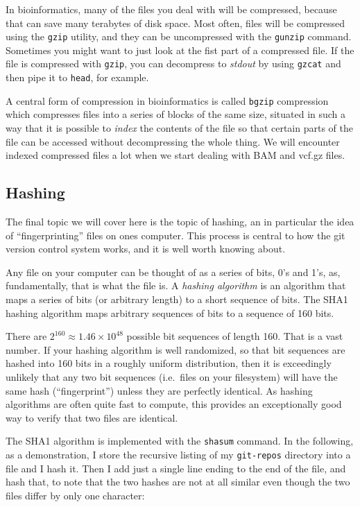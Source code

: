 \documentclass[]{krantz}
\begin{document}
In bioinformatics, many of the files you deal with will be compressed, because that
can save many terabytes of disk space. Most often, files will be compressed using the
\texttt{gzip} utility, and they can be uncompressed with the \texttt{gunzip} command. Sometimes
you might want to just look at the fist part of a compressed file. If the file is compressed
with \texttt{gzip}, you can decompress to \emph{stdout} by using \texttt{gzcat} and then pipe it to \texttt{head}, for example.

A central form of compression in bioinformatics is called \texttt{bgzip} compression
which compresses files into a series of blocks of the same size, situated in such a way that
it is possible to \emph{index} the contents of the file so that certain parts of the file can be
accessed without decompressing the whole thing. We will encounter indexed compressed files a
lot when we start dealing with BAM and vcf.gz files.

\hypertarget{hashing}{%
\subsection{Hashing}\label{hashing}}

The final topic we will cover here is the topic of hashing, an in particular
the idea of ``fingerprinting'' files on ones computer. This process is central
to how the git version control system works, and it is well worth knowing about.

Any file on your computer can be thought of as a series of bits, 0's and 1's, as,
fundamentally, that is what the file is. A \emph{hashing algorithm} is an algorithm
that maps a series of bits (or arbitrary length) to a short sequence of bits. The
SHA1 hashing algorithm maps arbitrary sequences of bits to a sequence of 160 bits.

There are \(2^{160} \approx 1.46 \times 10^{48}\) possible bit sequences of length 160.
That is a vast number. If your hashing algorithm is well randomized, so that bit sequences
are hashed into 160 bits in a roughly uniform distribution, then it is exceedingly unlikely
that any two bit sequences (i.e.~files on your filesystem) will have the same hash (``fingerprint'')
unless they are perfectly identical. As hashing algorithms are often quite fast to compute,
this provides an exceptionally good way to verify that two files are identical.

The SHA1 algorithm is implemented with the \texttt{shasum} command. In the following,
as a demonstration, I store the recursive listing of my \texttt{git-repos} directory into
a file and I hash it. Then I add just a single line ending to the end
of the file, and hash that, to note that the two hashes are not at all similar
even though the two files differ by only one character:
\end{document}
